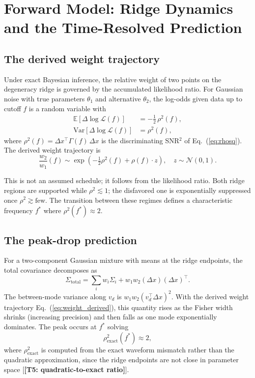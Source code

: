 \documentclass[twocolumn,prd,showpacs,superscriptaddress]{revtex4-2}
\newcommand{\vd}{v_{d}}          %
\newcommand{\manifest}[1]{\textbf{[#1]}}
\newcommand{\eqnref}[1]{Eq.~(\ref{eq:#1})}
\begin{document}
\section{Forward Model: Ridge Dynamics and the Time-Resolved Prediction}
\label{sec:forward}

\subsection{The derived weight trajectory}

Under exact Bayesian inference, the relative weight of two points on the degeneracy ridge is governed by the accumulated likelihood ratio. For Gaussian noise with true parameters $\theta_1$ and alternative $\theta_2$, the log-odds given data up to cutoff $f$ is a random variable with
\begin{align}
\mathbb{E}[\Delta\log\mathcal{L}(f)] &= -\tfrac12\, \rho^2(f), \\
\text{Var}[\Delta\log\mathcal{L}(f)] &= \rho^2(f),
\end{align}
where $\rho^2(f) = \Delta x^\top \Gamma(f)\,\Delta x$ is the discriminating SNR$^2$ of \eqnref{rhosq}. The derived weight trajectory is
\begin{equation}
\frac{w_2}{w_1}(f) \sim \exp\left(-\tfrac12\rho^2(f) + \rho(f)\cdot z\right),\quad z \sim \mathcal{N}(0,1).
\label{eq:weight_derived}
\end{equation}

This is not an assumed schedule; it follows from the likelihood ratio. Both ridge regions are supported while $\rho^2 \lesssim 1$; the disfavored one is exponentially suppressed once $\rho^2 \gtrsim \text{few}$. The transition between these regimes defines a characteristic frequency $f^*$ where $\rho^2(f^*) \approx 2$.

\subsection{The peak-drop prediction}

For a two-component Gaussian mixture with means at the ridge endpoints, the total covariance decomposes as
\begin{equation}
\Sigma_{\text{total}} = \sum_i w_i \Sigma_i + w_1 w_2 (\Delta x)(\Delta x)^\top.
\label{eq:covariance_decomp}
\end{equation}
The between-mode variance along $\vd$ is $w_1 w_2 (\vd^\top \Delta x)^2$. With the derived weight trajectory \eqnref{weight_derived}, this quantity rises as the Fisher width shrinks (increasing precision) and then falls as one mode exponentially dominates. The peak occurs at $f^*$ solving
\begin{equation}
\rho^2_{\text{exact}}(f^*) \approx 2,
\label{eq:fstar}
\end{equation}
where $\rho^2_{\text{exact}}$ is computed from the exact waveform mismatch rather than the quadratic approximation, since the ridge endpoints are not close in parameter space [\manifest{T5: quadratic-to-exact ratio}].
\end{document}

